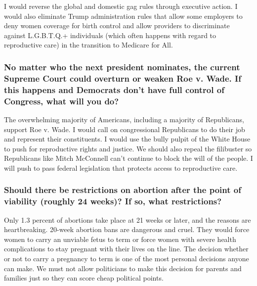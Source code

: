 I would reverse the global and domestic gag rules through executive
action. I would also eliminate Trump administration rules that allow
some employers to deny women coverage for birth control and allow
providers to discriminate against L.G.B.T.Q.+ individuals (which often
happens with regard to reproductive care) in the transition to Medicare
for All.

\hypertarget{no-matter-who-the-next-president-nominates-the-current-supreme-court-could-overturn-or-weaken-roe-v-wade-if-this-happens-and-democrats-dont-have-full-control-of-congress-what-will-you-do-7}{%
\subsubsection{No matter who the next president nominates, the current
Supreme Court could overturn or weaken Roe v. Wade. If this happens and
Democrats don't have full control of Congress, what will you
do?}\label{no-matter-who-the-next-president-nominates-the-current-supreme-court-could-overturn-or-weaken-roe-v-wade-if-this-happens-and-democrats-dont-have-full-control-of-congress-what-will-you-do-7}}

The overwhelming majority of Americans, including a majority of
Republicans, support Roe v. Wade. I would call on congressional
Republicans to do their job and represent their constituents. I would
use the bully pulpit of the White House to push for reproductive rights
and justice. We should also repeal the filibuster so Republicans like
Mitch McConnell can't continue to block the will of the people. I will
push to pass federal legislation that protects access to reproductive
care.

\hypertarget{should-there-be-restrictions-on-abortion-after-the-point-of-viability-roughly-24-weeks-if-so-what-restrictions-7}{%
\subsubsection{Should there be restrictions on abortion after the point
of viability (roughly 24 weeks)? If so, what
restrictions?}\label{should-there-be-restrictions-on-abortion-after-the-point-of-viability-roughly-24-weeks-if-so-what-restrictions-7}}

Only 1.3 percent of abortions take place at 21 weeks or later, and the
reasons are heartbreaking. 20-week abortion bans are dangerous and
cruel. They would force women to carry an unviable fetus to term or
force women with severe health complications to stay pregnant with their
lives on the line. The decision whether or not to carry a pregnancy to
term is one of the most personal decisions anyone can make. We must not
allow politicians to make this decision for parents and families just so
they can score cheap political points.

